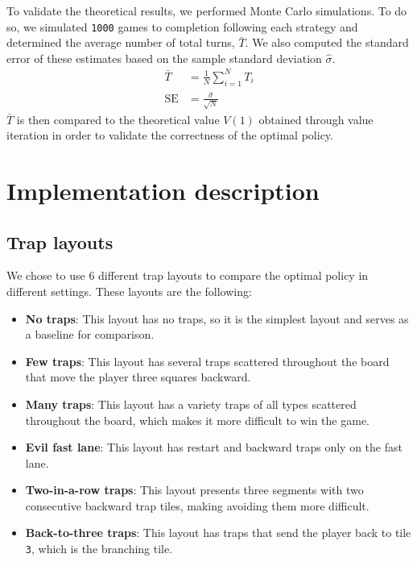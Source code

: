 \documentclass[12pt, twocolumn]{article}
\begin{document}
\noindent To validate the theoretical results, we performed Monte Carlo simulations. To do so, we simulated \texttt{1000} games to completion following each strategy and determined the average number of total turns, $\bar{T}$. We also computed the standard error of these estimates based on the sample standard deviation $\hat{\sigma}$.
\begin{equation*}
    \begin{split}
        \bar{T} &= \frac{1}{N} \sum_{i=1}^{N} T_i \\
        \mathrm{SE} &= \frac{\hat{\sigma}}{\sqrt{N}}
    \end{split}
\end{equation*}
$\bar{T}$ is then compared to the theoretical value $V(1)$ obtained through value iteration in order to validate the correctness of the optimal policy.

\section*{Implementation description}

\subsection*{Trap layouts}

We chose to use 6 different trap layouts to compare the optimal policy in different settings. These layouts are the following:
\begin{itemize}
    \item \textbf{No traps}: This layout has no traps, so it is the simplest layout and serves as a baseline for comparison.
    \item \textbf{Few traps}: This layout has several traps scattered throughout the board that move the player three squares backward.
    \item \textbf{Many traps}: This layout has a variety traps of all types scattered throughout the board, which makes it more difficult to win the game.
    \item \textbf{Evil fast lane}: This layout has restart and backward traps only on the fast lane.
    \item \textbf{Two-in-a-row traps}: This layout presents three segments with two consecutive backward trap tiles, making avoiding them more difficult.
    \item \textbf{Back-to-three traps}: This layout has traps that send the player back to tile \texttt{3}, which is the branching tile.

\end{itemize}
\end{document}
